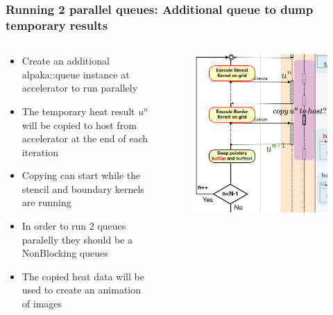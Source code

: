 \documentclass[9pt]{beamer}
\begin{document}
\begin{frame}
\frametitle{Running 2 parallel queues: Additional queue to dump temporary results}
\begin{columns}
  \begin{column}{0.63\textwidth}
\begin{itemize}
 \item Create an additional alpaka::queue instance at accelerator to run parallely
 \item The temporary heat result $u^{n}$ will be copied to host from accelerator at the end of each iteration
 \item Copying can start while the stencil and boundary kernels are running
 \item In order to run 2 queues paralelly they should be a NonBlocking queues
 \item The copied heat data will be used to create an animation of images
\end{itemize}
  \end{column}

  \begin{column}{0.37\textwidth}
\begin{figure}
    \centering
    \includegraphics[width=0.99\linewidth]{Screenshot from 2024-09-26 15-53-41.png}
\end{figure}
  \end{column}
  \end{columns}
\end{frame}
\end{document}
